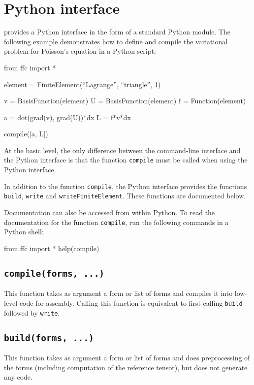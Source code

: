 \chapter{Python interface}

\ffc{} provides a Python interface in the form of a standard
Python module. The following example demonstrates how to define and
compile the variational problem for Poisson's equation in a Python
script:

\begin{code}
 from ffc import *

 element = FiniteElement(``Lagrange'', ``triangle'', 1)

 v = BasisFunction(element)
 U = BasisFunction(element)
 f = Function(element)
  
 a = dot(grad(v), grad(U))*dx
 L = f*v*dx

 compile([a, L])
\end{code}

At the basic level, the only difference between the command-line
interface and the Python interface is that the function
\texttt{compile} must be called when using the Python interface.

In addition to the function \texttt{compile}, the Python interface
provides the functions \texttt{build}, \texttt{write} and
\texttt{writeFiniteElement}. These functions are documented below.

Documentation can also be accessed from within Python. To read the
documentation for the function \texttt{compile}, run the following
commands in a Python shell:

\begin{code}
 from ffc import *
 help(compile)
\end{code}

\section{\texttt{compile(forms, ...)}}

This function takes as argument a form or list of forms and compiles
it into low-level code for assembly. Calling this function is
equivalent to first calling \texttt{build} followed by \texttt{write}.

\section{\texttt{build(forms, ...)}}

This function takes as argument a form or list of forms
and does preprocessing of the forms (including computation of the
reference tensor), but does not generate any code.

